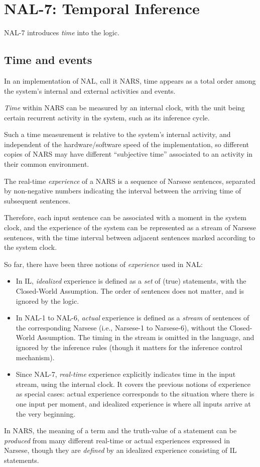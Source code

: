 
\chapter{NAL-7: Temporal Inference}

NAL-7 introduces \emph{time} into the logic.  

\section{Time and events}

In an implementation of NAL, call it NARS, time appears as a total order among the system's internal and external activities and events.

\begin{defi}
\emph{Time} within NARS can be measured by an internal clock, with the unit being certain recurrent activity in the system, such as its inference cycle. 
\end{defi}
Such a time measurement is relative to the system's internal activity, and independent of the hardware/software speed of the implementation, so different copies of NARS may have different ``subjective time'' associated to an activity in their common environment.

\begin{defi}
The real-time \emph{experience} of a NARS is a sequence of Narsese sentences, separated by non-negative numbers indicating the interval between the arriving time of subsequent sentences.
\end{defi}
Therefore, each input sentence can be associated with a moment in the system clock, and the experience of the system can be represented as a stream of Narsese sentences, with the time interval between adjacent sentences marked according to the system clock.

So far, there have been three notions of \emph{experience} used in NAL:
\begin{itemize}
	\item In IL, \emph{idealized} experience is defined as a \emph{set} of (true) statements, with the Closed-World Assumption. The order of sentences does not matter, and is ignored by the logic.
	\item In NAL-1 to NAL-6, \emph{actual} experience is defined as a \emph{stream} of sentences of the corresponding Narsese (i.e., Narsese-1 to Narsese-6), without the Closed-World Assumption. The timing in the stream is omitted in the language, and ignored by the inference rules (though it matters for the inference control mechanism).
	\item Since NAL-7, \emph{real-time} experience explicitly indicates time in the input stream, using the internal clock. It covers the previous notions of experience as special cases: actual experience corresponds to the situation where there is one input per moment, and idealized experience is where all inputs arrive at the very beginning.
\end{itemize}
In NARS, the meaning of a term and the truth-value of a statement can be \emph{produced} from many different real-time or actual experiences expressed in Narsese, though they are \emph{defined} by an idealized experience consisting of IL statements.

